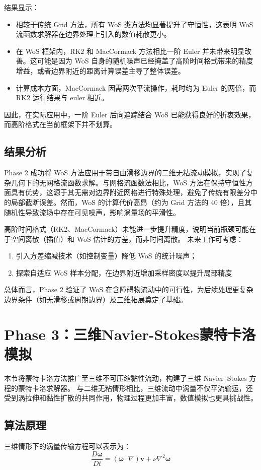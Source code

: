 \documentclass[UTF8,fontset=fandol]{ctexart}
\begin{document}
结果显示：
\begin{itemize}
    \item 相较于传统 Grid 方法，所有 WoS 类方法均显著提升了守恒性，这表明 WoS 流函数求解器在边界处理上引入的数值耗散更小。
    \item 在 WoS 框架内，RK2 和 MacCormack 方法相比一阶 Euler 并未带来明显改善。这可能是因为 WoS 自身的随机噪声已经掩盖了高阶时间格式带来的精度增益，或者边界附近的距离计算误差主导了整体误差。
    \item 计算成本方面，MacCormack 因需两次平流操作，耗时约为 Euler 的两倍，而 RK2 运行结果与 euler 相近。
\end{itemize}

因此，在实际应用中，一阶 Euler 后向追踪结合 WoS 已能获得良好的折衷效果，而高阶格式在当前框架下并不划算。
\subsection{结果分析}
Phase 2 成功将 WoS 方法应用于带自由滑移边界的二维无粘流动模拟，实现了复杂几何下的无网格流函数求解。与网格流函数法相比，WoS 方法在保持守恒性方面具有优势，这源于其无需对边界附近网格进行特殊处理，避免了传统有限差分中的局部截断误差。然而，WoS 的计算代价高昂（约为 Grid 方法的 40 倍），且其随机性导致流场中存在可见噪声，影响涡量场的平滑性。

高阶时间格式（RK2、MacCormack）未能进一步提升精度，说明当前瓶颈可能在于空间离散（插值）和 WoS 估计的方差，而非时间离散。
未来工作可考虑：
\begin{enumerate}
    \item 引入方差缩减技术（如控制变量）降低 WoS 的统计噪声；
    \item 探索自适应 WoS 样本分配，在边界附近增加采样密度以提升局部精度
\end{enumerate}

总体而言，Phase 2 验证了 WoS 在含障碍物流动中的可行性，为后续处理更复杂边界条件（如无滑移或周期边界）及三维拓展奠定了基础。

\section{Phase 3：三维Navier-Stokes蒙特卡洛模拟}

本节将蒙特卡洛方法推广至三维不可压缩黏性流动，构建了三维 Navier–Stokes 方程的蒙特卡洛求解器。
与二维无粘情形相比，三维流动中涡量不仅平流输运，还受到涡拉伸和黏性扩散的共同作用，物理过程更加丰富，数值模拟也更具挑战性。

\subsection{算法原理}
三维情形下的涡量传输方程可以表示为：
\[ \frac{D \mathbf{\omega}}{D t} = (\mathbf{\omega} \cdot \nabla) \mathbf{v} + \nu \nabla^2 \mathbf{\omega} \]
\end{document}
